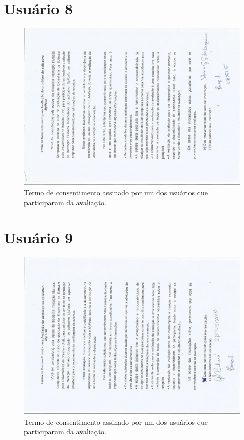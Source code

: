 \begin{anexosenv}
      \section*{Usuário 8}
    \begin{figure}[!htbp]
      \centering
      \includegraphics[scale=0.6, angle=-90]{editaveis/figuras/iohana}
      \caption{Termo de consentimento assinado por um dos usuários que participaram da avaliação.}
      \label{termo_consentimento_1}
    \end{figure}
    
      \section*{Usuário 9}
    \begin{figure}[!htbp]
      \centering
      \includegraphics[scale=0.6, angle=-90]{editaveis/figuras/guilherme}
      \caption{Termo de consentimento assinado por um dos usuários que participaram da avaliação.}
      \label{termo_consentimento_1}
    \end{figure}
    

\end{anexosenv}
